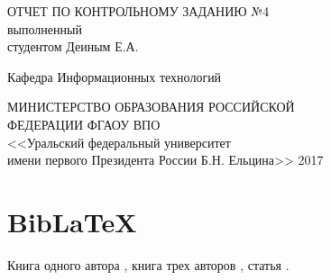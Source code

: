 \documentclass[a4paper,14pt]{book}
\begin{document}
    \begin{titlepage}
        \begin{center}
            ОТЧЕТ ПО КОНТРОЛЬНОМУ ЗАДАНИЮ №4 \\
            выполненный \\
            студентом Деиным Е.А.\par
            \vfill
            Кафедра Информационных технологий\par
            \vfill
            МИНИСТЕРСТВО ОБРАЗОВАНИЯ РОССИЙСКОЙ\\ \vspace{0.1cm}ФЕДЕРАЦИИ
            ФГАОУ ВПО\\ \vspace{0.1cm} <<Уральский федеральный университет\\ \vspace{0.1cm} имени первого Президента России Б.Н. Ельцина>>
            \vspace{0.5cm}
            2017
        \end{center}
    \end{titlepage}
    \setcounter{page}{2}
    
    \section{Bib\LaTeX}
    Книга одного автора \cite{b1}, книга трех авторов \cite[~8]{b3}, статья \cite{article}.
    
    \printbibliography
    
    \linespread{1.5}     
    
    
\end{document}

